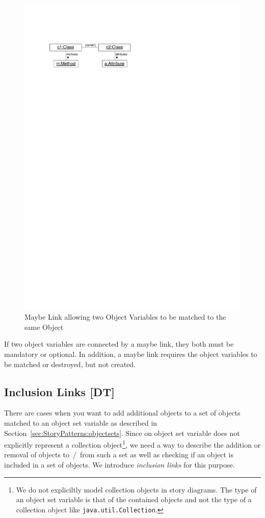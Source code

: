 \begin{figure}[htb]
  \centering
  \includegraphics[scale=.8]{figures/MaybeLink}
  \caption{Maybe Link allowing two Object Variables to be matched to the same Object}
  \label{fig:maybeLink}
\end{figure}

If two object variables are connected by a maybe link, they both must be mandatory or optional. In addition, a maybe link requires the object variables to be matched or destroyed, but not created.  



\subsection{Inclusion Links [DT]}
\label{sec:StoryPatterns:inclusion}

There are cases when you want to add additional objects to a set of objects matched to an object set variable as described in Section~\ref{sec:StoryPatterns:objectsets}.
Since on object set variable does not explicitly represent a collection object\footnote{
We do not expliciltly model collection objects in story diagrams.
The type of an object set variable is that of the contained objects and not the type of a collection object like \texttt{java.util.Collection}.},
we need a way to describe the addition or removal of objects to~/~from such a set as well as checking if an object is included in a set of objects.
We introduce \emph{inclusion links} for this purpose.

